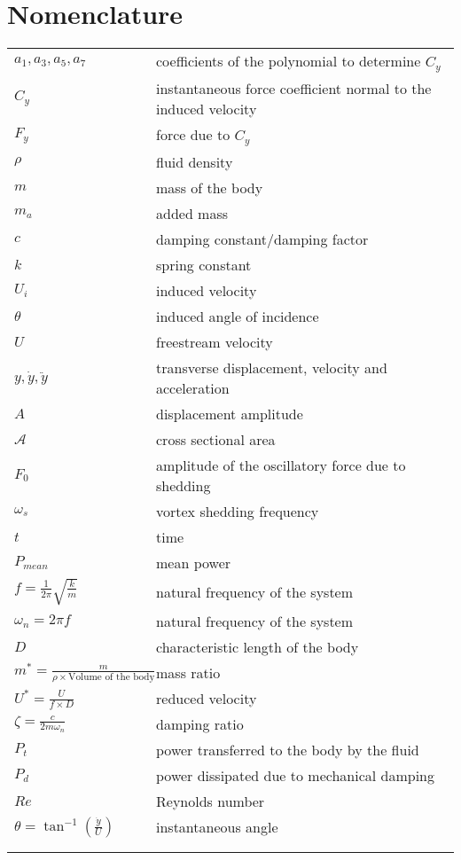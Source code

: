 \section*{Nomenclature}



\begin{tabular}{ll}
$a_1,a_3,a_5,a_7$ & coefficients of the polynomial to determine $C_y$ \\ 
$C_y$ & instantaneous force coefficient normal to the induced velocity \\
$F_y$ & force due to $C_y$  \\ 
$\rho$ & fluid density  \\
$m$ & mass of the body \\
$m_a$ & added mass \\
$c$ & damping constant/damping factor \\
$k$ & spring constant \\
$U_i$ & induced velocity \\
$\theta$ & induced angle of incidence \\
$U$ & freestream velocity \\
$y,\dot{y},\ddot{y}$ & transverse displacement, velocity and acceleration   \\
$A$ & displacement amplitude\\
$\mathcal{A}$ & cross sectional area\\ 
$F_0$& amplitude of the oscillatory force due to shedding \\
$\omega_s$& vortex shedding frequency \\
$t$ & time \\
$P_{mean}$& mean power \\
$f=\frac{1}{2\pi}\sqrt{\frac{k}{m}}$& natural frequency of the system \\
$\omega_n= 2 \pi f$& natural frequency of the system  \\
$D$ & characteristic length of the body  \\
$m^*=\frac{m}{\rho \times \text{Volume of the body}}$& mass ratio \\
$U^*=\frac{U}{f \times D}$& reduced velocity  \\
$\zeta= \frac{c}{2 m \omega_n}$& damping ratio \\
$P_t$   & power transferred to the body by the fluid \\
$P_d$& power dissipated due to mechanical damping  \\
$Re$& Reynolds number  \\
$\theta= \tan^{-1}{(\frac{\dot{y}}{U})}$& instantaneous angle \\
& \\
& \\
\end{tabular}  
